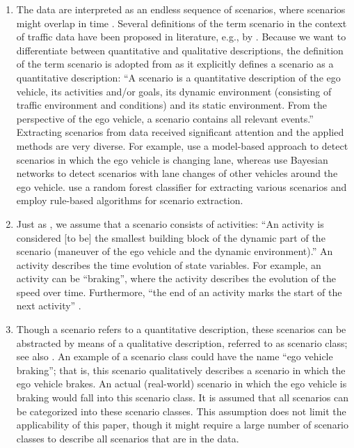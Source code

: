 \begin{enumerate}
	\item The data are interpreted as an endless sequence of scenarios, where scenarios might overlap in time \cite{elrofai2018scenario}. Several definitions of the term scenario in the context of traffic data have been proposed in literature, e.g., by \textcite{geyer2014, ulbrich2015, elrofai2016scenario, elrofai2018scenario}. Because we want to differentiate between quantitative and qualitative descriptions, the definition of the term scenario is adopted from \textcite{elrofai2018scenario} as it explicitly defines a scenario as a quantitative description: ``A scenario is a quantitative description of the ego vehicle, its activities and/or goals, its dynamic environment (consisting of traffic environment and conditions) and its static environment. From the perspective of the ego vehicle, a scenario contains all relevant events.'' Extracting scenarios from data received significant attention and the applied methods are very diverse. For example, \textcite{elrofai2016scenario} use a model-based approach to detect scenarios in which the ego vehicle is changing lane, whereas \textcite{kasper2012oobayesnetworks} use Bayesian networks to detect scenarios with lane changes of other vehicles around the ego vehicle. \textcite{xie2017driving} use a random forest classifier for extracting various scenarios and \textcite{paardekooper2019dataset6000km} employ rule-based algorithms for scenario extraction.
	
	\item Just as \textcite{elrofai2018scenario}, we assume that a scenario consists of activities: ``An activity is considered [to be] the smallest building block of the dynamic part of the scenario (maneuver of the ego vehicle and the dynamic environment).'' An activity describes the time evolution of state variables. For example, an activity can be ``braking'', where the activity describes the evolution of the speed over time. Furthermore, ``the end of an activity marks the start of the next activity'' \cite{elrofai2018scenario}.
	
	\item Though a scenario refers to a quantitative description, these scenarios can be abstracted by means of a qualitative description, referred to as scenario class; see also \textcite{ploeg2018cetran, elrofai2018scenario}. An example of a scenario class could have the name ``ego vehicle braking''; that is, this scenario qualitatively describes a scenario in which the ego vehicle brakes. An actual (real-world) scenario in which the ego vehicle is braking would fall into this scenario class. It is assumed that all scenarios can be categorized into these scenario classes. This assumption does not limit the applicability of this paper, though it might require a large number of scenario classes to describe all scenarios that are in the data.
	

\end{enumerate}
